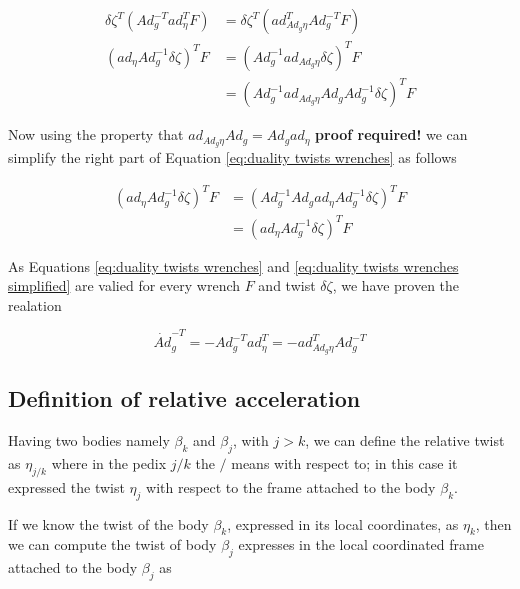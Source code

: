 \documentclass[12pt,a4paper]{book}
\begin{document}
\begin{equation}\label{eq:duality twists wrenches}
\begin{aligned}
	\delta \zeta ^T \left( Ad_g^{-T} ad_\eta^T F  \right) &= \delta \zeta ^T \left( ad_{Ad_g \eta}^TAd_g^{-T} F  \right) \\
	\left(  ad_\eta Ad_g^{-1} \delta \zeta  \right)^T F &= \left( Ad_g^{-1} ad_{Ad_g \eta}  \delta \zeta  \right)^T F \\
	&= \left( Ad_g^{-1} ad_{Ad_g \eta}  Ad_g Ad_g ^{-1}\delta \zeta  \right)^T F
\end{aligned}
\end{equation}

Now using the property that $ad_{Ad_g \eta}  Ad_g = Ad_g ad_{ \eta}$ \color{red} \textbf{proof required!}\color{black} we can simplify the right part of Equation \eqref{eq:duality twists wrenches} as follows

\begin{equation}\label{eq:duality twists wrenches simplified}
\begin{aligned}
	\left(  ad_\eta Ad_g^{-1} \delta \zeta  \right)^T F &= \left( Ad_g^{-1} Ad_g ad_{ \eta} Ad_g ^{-1}\delta \zeta  \right)^T F \\
	&= \left( ad_{ \eta} Ad_g ^{-1}\delta \zeta  \right)^T F
\end{aligned}
\end{equation}

As Equations \eqref{eq:duality twists wrenches} and \eqref{eq:duality twists wrenches simplified} are valied for every wrench $F$ and twist $\delta \zeta$, we have proven the realation

\begin{equation}
	\dot{Ad}_g^{-T} = - Ad_g^{-T} ad_\eta ^T = - ad^T _{Ad_g \eta} Ad_g ^{-T}
\end{equation}


\subsection{Definition of relative acceleration}

Having two bodies namely $\beta_k$ and $\beta_j$, with $j>k$, we can define the relative twist as $\eta_{j/k}$ where in the pedix $j/k$ the $/$ means with respect to; in this case it expressed the twist $\eta_j$ with respect to the frame attached to the body $\beta_k$.

If we know the twist of the body $\beta_k$, expressed in its local coordinates, as $\eta_k$, then we can compute the twist of body $\beta_j$ expresses in the local coordinated frame attached to the body $\beta_j$ as 
\end{document}
